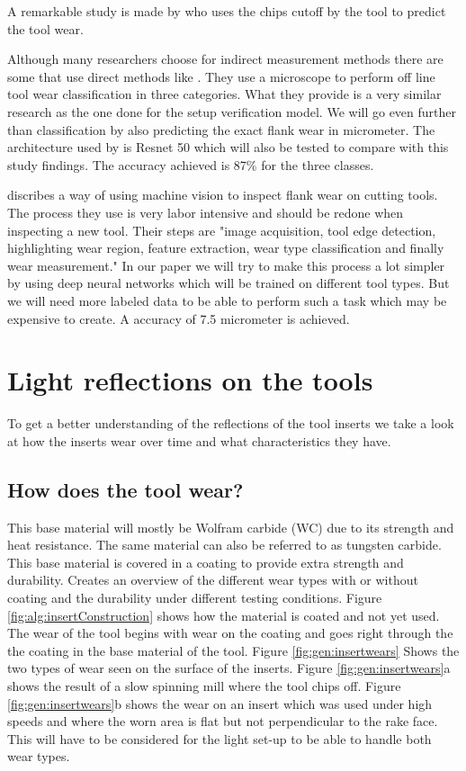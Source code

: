 		A remarkable study is made by \cite{Pagani2020} who uses the chips cutoff by the tool to predict the tool wear. 
           
           
           Although many researchers choose for indirect measurement methods there are some that use direct methods like \cite{Ambadekar2020}. They use a microscope to perform off line tool wear classification in three categories. What they provide is a very similar research as the one done for the setup verification model. We will go even further than classification by also predicting the exact flank wear in micrometer. The architecture used by \citeauthor{Ambadekar2020} is Resnet 50 which will also be tested to compare with this study findings. The accuracy achieved is 87\% for the three classes.
           
                 \cite{Schmitt2012} discribes a way of using machine vision to inspect flank wear on cutting tools. The process they use is very labor intensive and should be redone when inspecting a new tool. Their steps are "image acquisition, tool edge detection, highlighting wear region, feature extraction, wear type classification and finally wear measurement." In our paper we will try to make this process a lot simpler by using deep neural networks which will be trained on different tool types. But we will need more labeled data to be able to perform such a task which may be expensive to create. A accuracy of 7.5 micrometer is achieved.
           
           
            
\section{Light reflections on the tools}

To get a better understanding of the reflections of the tool inserts we take a look at how the inserts wear over time and what characteristics they have.

\subsection{How does the tool wear?}
	
	This base material will mostly be Wolfram carbide (WC) due to its strength and heat resistance. The same material can also be referred to as tungsten carbide. This base material is covered in a coating to provide extra strength and durability.
	\cite{Gu1999} Creates an overview of the different wear types with or without coating and the durability under different testing conditions. Figure \ref{fig:alg:insertConstruction} shows how the material is coated and not yet used. 
	The wear of the tool begins with wear on the coating and goes right through the the coating in the base material of the tool. 
	Figure \ref{fig:gen:insertwears} Shows the two types of wear seen on the surface of the inserts. Figure \ref{fig:gen:insertwears}a shows the result of a slow spinning mill where the tool chips off. Figure \ref{fig:gen:insertwears}b shows the wear on an insert which was used under high speeds and where the worn area is flat but not perpendicular to the rake face. This will have to be considered for the light set-up to be able to handle both wear types.
	
